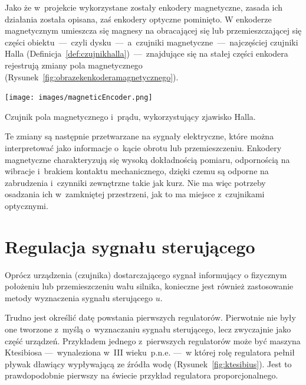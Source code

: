 Jako że w~projekcie wykorzystane zostały enkodery magnetyczne, zasada ich działania została opisana, zaś enkodery optyczne pominięto. W enkoderze magnetycznym umieszcza się magnesy na obracającej się lub przemieszczającej się części obiektu~---~czyli dysku~---~a~czujniki magnetyczne~---~najczęściej czujniki Halla (Definicja~\ref{def:czujnikhalla})~---~znajdujące się na stałej części enkodera rejestrują zmiany pola magnetycznego (Rysunek~\ref{fig:obrazekenkoderamagnetycznego}). 

\begin{center}
  \texttt{[image: images/magneticEncoder.png]}
  \label{fig:obrazekenkoderamagnetycznego}
\end{center}

\begin{Definition}\label{def:czujnikhalla}
  Czujnik pola magnetycznego i~prądu, wykorzystujący zjawisko Halla.
\end{Definition}

Te zmiany są następnie przetwarzane na sygnały elektryczne, które można interpretować jako informacje o~kącie obrotu lub przemieszczeniu. Enkodery magnetyczne charakteryzują się wysoką dokładnością pomiaru, odpornością na wibracje i~brakiem kontaktu mechanicznego, dzięki czemu są odporne na zabrudzenia i~czynniki zewnętrzne takie jak kurz. Nie ma więc potrzeby osadzania ich w~zamkniętej przestrzeni, jak to ma miejsce z~czujnikami optycznymi.

\section{Regulacja sygnału sterującego}
\label{ch:regulatory}
Oprócz urządzenia (czujnika) dostarczającego sygnał informujący o fizycznym położeniu lub przemieszczeniu wału silnika, konieczne jest również zastosowanie metody wyznaczenia sygnału sterującego $u$. 

Trudno jest określić datę powstania pierwszych regulatorów. Pierwotnie nie były one tworzone z~myślą o~wyznaczaniu sygnału sterującego, lecz zwyczajnie jako część urządzeń. Przykładem jednego z~pierwszych regulatorów może być maszyna Ktesibiosa ---~wynaleziona w~III wieku~p.n.e.\cite{bib:regulatorktesibiusa} ---~w której rolę regulatora pełnił pływak dławiący wypływającą ze źródła wodę (Rysunek~\ref{fig:ktesibius}). Jest to prawdopodobnie pierwszy na świecie przykład regulatora proporcjonalnego.

